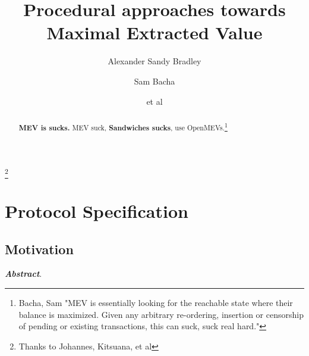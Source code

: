 \documentclass[runningheads]{llncs}
\begin{document}
%
\title{Procedural approaches towards Maximal Extracted Value}
%
\author{Alexander Sandy Bradley \and
	Sam Bacha \and
	et al}
%
%

\thanks{Thanks to Johannes, Kitsuana, et al}
%
\maketitle              %


\tableofcontents



\newpage

\chapter{Protocol Specification}
\begin{abstract}
\text{}
\newline
\newline
	\textbf{MEV is sucks. }\newline
	MEV suck, \textbf{Sandwiches sucks},  \newline
	\newline
	use OpenMEVs.\footnote{Bacha, Sam "MEV is essentially looking for the reachable state where their balance is maximized. Given any arbitrary re-ordering, insertion or censorship of pending or existing transactions, this can suck, suck real hard."}
\end{abstract}

\section{Motivation}
 \textbf{\emph{Abstract}}. 
\end{document}
